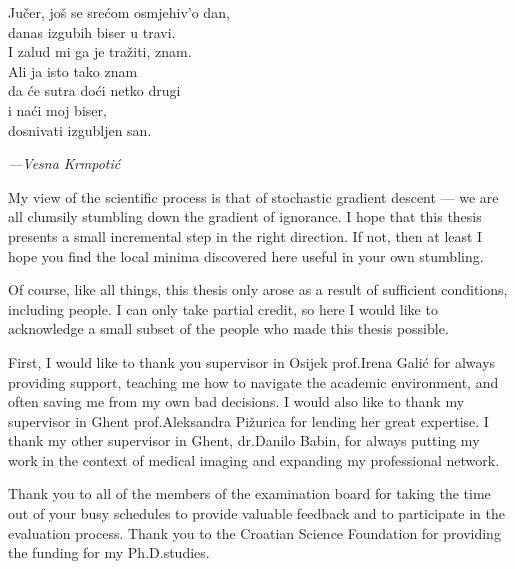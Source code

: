 
\renewcommand{\epigraphflush}{flushleft}
\renewcommand{\sourceflush}{flushleft}
\setlength{\epigraphwidth}{0.8\textwidth}
\setlength{\epigraphrule}{0pt}

\begin{acknowledgements}
  \addchaptertocentry{\acknowledgementname} %
  
 \epigraph{
Jučer, još se srećom osmjehiv'o dan,\\
danas izgubih biser u travi.\\
I zalud mi ga je tražiti, znam.\\
\vspace{0.5em}
Ali ja isto tako znam\\
da će sutra doći netko drugi\\
\vspace{0.5em}
i naći moj biser,\\
dosnivati izgubljen san.}{\hspace{1em}\textit{---Vesna Krmpotić}}
  
  
My view of the scientific process is that of stochastic gradient descent --- we are all clumsily stumbling down the gradient of ignorance. I hope that this thesis presents a small incremental step in the right direction. If not, then at least I hope you find the local minima discovered here useful in your own stumbling. 

Of course, like all things, this thesis only arose as a result of sufficient conditions, including people. I can only take partial credit, so here I would like to acknowledge a small subset of the people who made this thesis possible.
  
First, I would like to thank you supervisor in Osijek prof.\@ Irena Galić for always providing support, teaching me how to navigate the academic environment, and often saving me from my own bad decisions. I would also like to thank my supervisor in Ghent prof.\@ Aleksandra Pižurica for lending her great expertise. I thank my other supervisor in Ghent, dr.\@ Danilo Babin, for always putting my work in the context of medical imaging and expanding my professional network.
  
Thank you to all of the members of the examination board for taking the time out of your busy schedules to provide valuable feedback and to participate in the evaluation process. Thank you to the Croatian Science Foundation for providing the funding for my Ph.D.\@ studies.
  

\end{acknowledgements}
